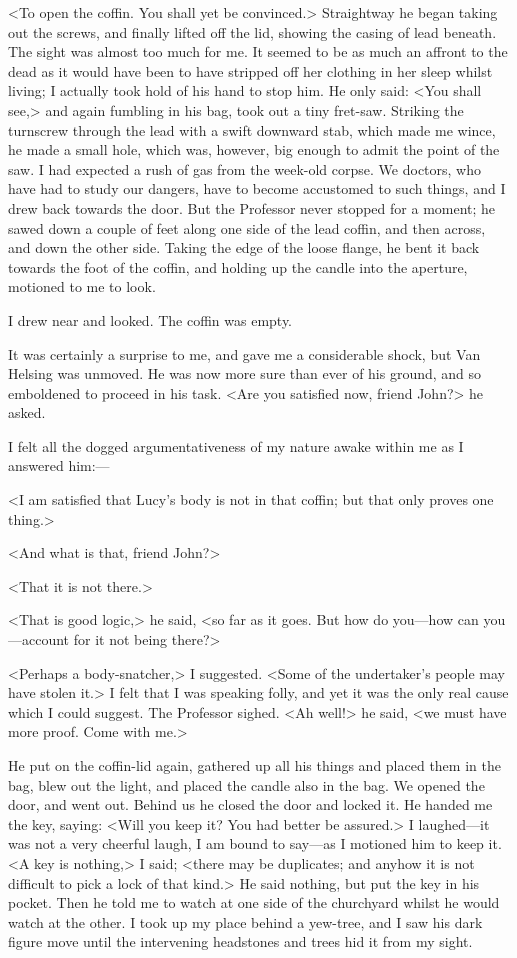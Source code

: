 <To open the coffin. You shall yet be convinced.> Straightway he began taking out the screws, and finally lifted off the lid, showing the casing of lead beneath. The sight was almost too much for me. It seemed to be as much an affront to the dead as it would have been to have stripped off her clothing in her sleep whilst living; I actually took hold of his hand to stop him. He only said: <You shall see,> and again fumbling in his bag, took out a tiny fret-saw. Striking the turnscrew through the lead with a swift downward stab, which made me wince, he made a small hole, which was, however, big enough to admit the point of the saw. I had expected a rush of gas from the week-old corpse. We doctors, who have had to study our dangers, have to become accustomed to such things, and I drew back towards the door. But the Professor never stopped for a moment; he sawed down a couple of feet along one side of the lead coffin, and then across, and down the other side. Taking the edge of the loose flange, he bent it back towards the foot of the coffin, and holding up the candle into the aperture, motioned to me to look.

I drew near and looked. The coffin was empty.

It was certainly a surprise to me, and gave me a considerable shock, but Van Helsing was unmoved. He was now more sure than ever of his ground, and so emboldened to proceed in his task. <Are you satisfied now, friend John?> he asked.

I felt all the dogged argumentativeness of my nature awake within me as I answered him:—

<I am satisfied that Lucy's body is not in that coffin; but that only proves one thing.>

<And what is that, friend John?>

<That it is not there.>

<That is good logic,> he said, <so far as it goes. But how do you—how can you—account for it not being there?>

<Perhaps a body-snatcher,> I suggested. <Some of the undertaker's people may have stolen it.> I felt that I was speaking folly, and yet it was the only real cause which I could suggest. The Professor sighed. <Ah well!> he said, <we must have more proof. Come with me.>

He put on the coffin-lid again, gathered up all his things and placed them in the bag, blew out the light, and placed the candle also in the bag. We opened the door, and went out. Behind us he closed the door and locked it. He handed me the key, saying: <Will you keep it? You had better be assured.> I laughed—it was not a very cheerful laugh, I am bound to say—as I motioned him to keep it. <A key is nothing,> I said; <there may be duplicates; and anyhow it is not difficult to pick a lock of that kind.> He said nothing, but put the key in his pocket. Then he told me to watch at one side of the churchyard whilst he would watch at the other. I took up my place behind a yew-tree, and I saw his dark figure move until the intervening headstones and trees hid it from my sight.

